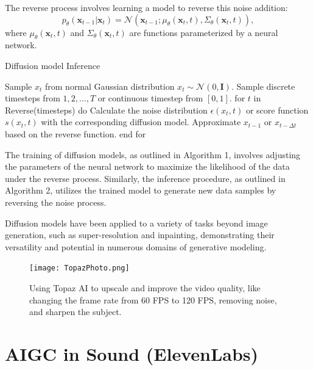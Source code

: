 \documentclass[11pt,a4paper,oneside]{report}
\begin{document}
The reverse process involves learning a model to reverse this noise addition:
\begin{equation}
p_{\theta}(\mathbf{x}_{t-1} | \mathbf{x}_t) = \mathcal{N}(\mathbf{x}_{t-1}; \mu_{\theta}(\mathbf{x}_t, t), \Sigma_{\theta}(\mathbf{x}_t, t)),
\end{equation}
where $\mu_{\theta}(\mathbf{x}_t, t)$ and $\Sigma_{\theta}(\mathbf{x}_t, t)$ are functions parameterized by a neural network.

\begin{algorithm}
\caption{Diffusion model Inference \cite{bie2023renaissance}}
\begin{algorithmic}[1]
\STATE Sample $x_t$ from normal Gaussian distribution $x_t \sim \mathcal{N}(0, \mathbf{I})$.
\STATE Sample discrete timesteps from $1, 2, \ldots, T$ or continuous timestep from $[0,1]$.
\STATE for $t$ in Reverse(timesteps) do
\STATE \hspace{\algorithmicindent} Calculate the noise distribution $\epsilon(x_t, t)$ or score function $s(x_t, t)$ with the corresponding diffusion model.
\STATE \hspace{\algorithmicindent} Approximate $x_{t-1}$ or $x_{t-\Delta t}$ based on the reverse function.
\STATE end for
\end{algorithmic}
\label{alg:diffusion_model_inference}
\end{algorithm}

The training of diffusion models, as outlined in Algorithm 1, involves adjusting the parameters of the neural network to maximize the likelihood of the data under the reverse process. Similarly, the inference procedure, as outlined in Algorithm 2, utilizes the trained model to generate new data samples by reversing the noise process.

Diffusion models have been applied to a variety of tasks beyond image generation, such as super-resolution and inpainting, demonstrating their versatility and potential in numerous domains of generative modeling.

\begin{figure}[htbp]
  \centering
  \texttt{[image: TopazPhoto.png]}
  \caption{Using Topaz AI to upscale and improve the video quality, like changing the frame rate from 60 FPS to 120 FPS, removing noise, and sharpen the subject.}
\end{figure}

\section{AIGC in Sound (ElevenLabs)}
\end{document}
